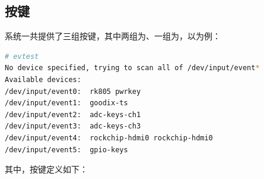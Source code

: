 \documentclass[UTF8]{ctexart}
\begin{document}

\subsection{按键}

系统一共提供了三组按键，其中两组为、一组为，以为例：

\begin{lstlisting}[language=sh]
# evtest 
No device specified, trying to scan all of /dev/input/event*
Available devices:
/dev/input/event0:	rk805 pwrkey
/dev/input/event1:	goodix-ts
/dev/input/event2:	adc-keys-ch1
/dev/input/event3:	adc-keys-ch3
/dev/input/event4:	rockchip-hdmi0 rockchip-hdmi0
/dev/input/event5:	gpio-keys
\end{lstlisting}

\noindent 其中，按键定义如下：
\end{document}
